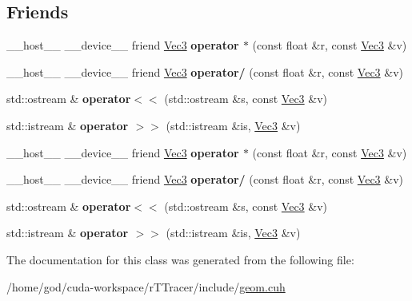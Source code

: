 \subsection*{Friends}
\begin{DoxyCompactItemize}
\item 
\+\_\+\+\_\+host\+\_\+\+\_\+ \+\_\+\+\_\+device\+\_\+\+\_\+ friend \hyperlink{class_vec3}{Vec3} {\bfseries operator $\ast$} (const float \&r, const \hyperlink{class_vec3}{Vec3} \&v)\hypertarget{class_vec3_a141803b5f0a53fcc6a6ffa5aea971591}{}\label{class_vec3_a141803b5f0a53fcc6a6ffa5aea971591}

\item 
\+\_\+\+\_\+host\+\_\+\+\_\+ \+\_\+\+\_\+device\+\_\+\+\_\+ friend \hyperlink{class_vec3}{Vec3} {\bfseries operator/} (const float \&r, const \hyperlink{class_vec3}{Vec3} \&v)\hypertarget{class_vec3_ad75f5e4b9aa9dec456c3bf19cd26ccb5}{}\label{class_vec3_ad75f5e4b9aa9dec456c3bf19cd26ccb5}

\item 
std\+::ostream \& {\bfseries operator$<$$<$} (std\+::ostream \&s, const \hyperlink{class_vec3}{Vec3} \&v)\hypertarget{class_vec3_a10e8b8671ee223eb6aea5a327901a5f0}{}\label{class_vec3_a10e8b8671ee223eb6aea5a327901a5f0}

\item 
std\+::istream \& {\bfseries operator $>$$>$} (std\+::istream \&is, \hyperlink{class_vec3}{Vec3} \&v)\hypertarget{class_vec3_ab9aefc3e1ca65751c7630a0154ede997}{}\label{class_vec3_ab9aefc3e1ca65751c7630a0154ede997}

\item 
\+\_\+\+\_\+host\+\_\+\+\_\+ \+\_\+\+\_\+device\+\_\+\+\_\+ friend \hyperlink{class_vec3}{Vec3} {\bfseries operator $\ast$} (const float \&r, const \hyperlink{class_vec3}{Vec3} \&v)\hypertarget{class_vec3_a141803b5f0a53fcc6a6ffa5aea971591}{}\label{class_vec3_a141803b5f0a53fcc6a6ffa5aea971591}

\item 
\+\_\+\+\_\+host\+\_\+\+\_\+ \+\_\+\+\_\+device\+\_\+\+\_\+ friend \hyperlink{class_vec3}{Vec3} {\bfseries operator/} (const float \&r, const \hyperlink{class_vec3}{Vec3} \&v)\hypertarget{class_vec3_ad75f5e4b9aa9dec456c3bf19cd26ccb5}{}\label{class_vec3_ad75f5e4b9aa9dec456c3bf19cd26ccb5}

\item 
std\+::ostream \& {\bfseries operator$<$$<$} (std\+::ostream \&s, const \hyperlink{class_vec3}{Vec3} \&v)\hypertarget{class_vec3_a10e8b8671ee223eb6aea5a327901a5f0}{}\label{class_vec3_a10e8b8671ee223eb6aea5a327901a5f0}

\item 
std\+::istream \& {\bfseries operator $>$$>$} (std\+::istream \&is, \hyperlink{class_vec3}{Vec3} \&v)\hypertarget{class_vec3_ab9aefc3e1ca65751c7630a0154ede997}{}\label{class_vec3_ab9aefc3e1ca65751c7630a0154ede997}

\end{DoxyCompactItemize}


The documentation for this class was generated from the following file\+:\begin{DoxyCompactItemize}
\item 
/home/god/cuda-\/workspace/r\+T\+Tracer/include/\hyperlink{r_t_tracer_2include_2geom_8cuh}{geom.\+cuh}\end{DoxyCompactItemize}
